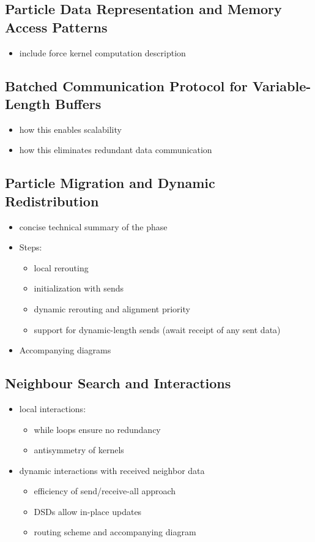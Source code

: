 \documentclass[review, anonymous, acmsmall]{acmart}
\begin{document}
\subsection{Particle Data Representation and Memory Access Patterns}
\begin{itemize}
  \item include force kernel computation description
\end{itemize}
\subsection{Batched Communication Protocol for Variable-Length Buffers}
\begin{itemize}
  \item how this enables scalability
  \item how this eliminates redundant data communication
\end{itemize}
\subsection{Particle Migration and Dynamic Redistribution}
\begin{itemize}
  \item concise technical summary of the phase
  \item Steps:
  \begin{itemize}
    \item local rerouting
    \item initialization with sends
    \item dynamic rerouting and alignment priority
    \item support for dynamic-length sends (await receipt of any sent data)
  \end{itemize}
  \item Accompanying diagrams
\end{itemize}
\subsection{Neighbour Search and Interactions}
\begin{itemize}
  \item local interactions:
  \begin{itemize}
    \item while loops ensure no redundancy
    \item antisymmetry of kernels
  \end{itemize}
  \item dynamic interactions with received neighbor data
  \begin{itemize}
    \item efficiency of send/receive-all approach
    \item DSDs allow in-place updates
    \item routing scheme and accompanying diagram
  \end{itemize}
\end{itemize}
\end{document}
